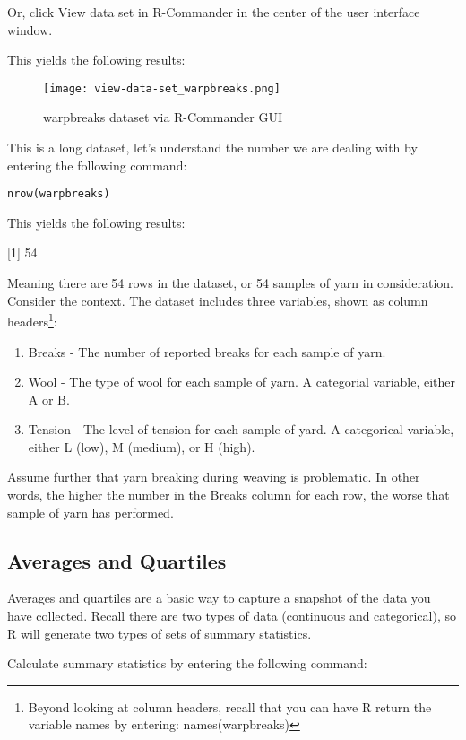 Or, click View data set in R-Commander in the center of the user interface 
window.

This yields the following results:

\begin{figure}[h!]
\texttt{[image: view-data-set\_warpbreaks.png]}
 \caption{warpbreaks dataset via R-Commander GUI}
 \label{fig:view-data-set_warpbreaks}
\end{figure}

This is a long dataset, let's understand the number we are dealing with by 
entering the following command:

\texttt{nrow(warpbreaks)}

This yields the following results:

[1] 54

Meaning there are 54 rows in the dataset, or 54 samples of yarn in 
consideration. Consider the context. The dataset includes three variables, 
shown as column headers\footnote{Beyond looking at column headers, recall that 
you can have R return the variable names by entering: names(warpbreaks)}:

\begin{enumerate}
 \item Breaks - The number of reported breaks for each sample of yarn.
 \item Wool - The type of wool for each sample of yarn. A categorial variable, 
 either A or B.
 \item Tension - The level of tension for each sample of yard. A categorical 
 variable, either L (low), M (medium), or H (high).
\end{enumerate}

Assume further that yarn breaking during weaving is problematic. In other 
words, the higher the number in the Breaks column for each row, the worse that 
sample of yarn has performed. 

\subsection{Averages and Quartiles}
Averages and quartiles are a basic way to capture a snapshot of the data you 
have collected. Recall there are two types of data (continuous and 
categorical), so R will generate two types of sets of summary statistics.

Calculate summary statistics by entering the following command:


